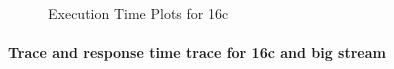 \documentclass[12pt,a4paper]{article}
\begin{document}
\begin{figure}[H]
    \vspace{0.5cm} %


    \caption{Execution Time Plots for 16c}
    \label{img:exps-read-input-variants}
\end{figure}

\paragraph{Trace and response time trace for 16c and big stream\\}
\newpage
\end{document}
